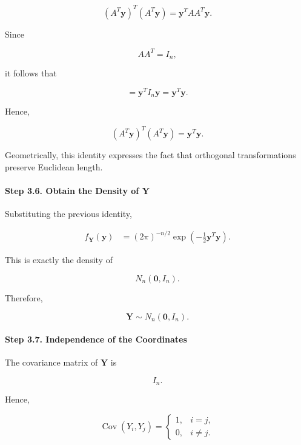\documentclass[11pt]{article}
\begin{document}
\begin{mdframed}[
		linewidth=0.8pt,
		roundcorner=6pt,
		backgroundcolor=gray!5,
		linecolor=gray!60,
		innertopmargin=10pt,
		innerbottommargin=10pt,
		innerleftmargin=10pt,
		innerrightmargin=10pt
		]
		\[
		(A^T\mathbf y)^T(A^T\mathbf y)
		=
		\mathbf y^TAA^T\mathbf y.
		\]
		
		Since
		
		\[
		AA^T=I_n,
		\]
		
		it follows that
		
		\[
		=
		\mathbf y^TI_n\mathbf y
		=
		\mathbf y^T\mathbf y.
		\]
		
		Hence,
		
		\[
		\boxed{
			(A^T\mathbf y)^T(A^T\mathbf y)
			=
			\mathbf y^T\mathbf y.
		}
		\]
		
		Geometrically, this identity expresses the fact that orthogonal
		transformations preserve Euclidean length.
		
		\vspace{0.3cm}
		
		\paragraph{Step 3.6. Obtain the Density of $\mathbf Y$}
		
		Substituting the previous identity,
		
		\[
		\begin{aligned}
			f_{\mathbf Y}(\mathbf y)
			&=
			(2\pi)^{-n/2}
			\exp
			\left(
			-\frac12
			\mathbf y^T\mathbf y
			\right).
		\end{aligned}
		\]
		
		This is exactly the density of
		
		\[
		N_n(\mathbf0,I_n).
		\]
		
		Therefore,
		
		\[
		\boxed{
			\mathbf Y
			\sim
			N_n(\mathbf0,I_n).
		}
		\]
		
		\vspace{0.3cm}
		
		\paragraph{Step 3.7. Independence of the Coordinates}
		
		The covariance matrix of $\mathbf Y$ is
		
		\[
		I_n.
		\]
		
		Hence,
		
		\[
		\operatorname{Cov}(Y_i,Y_j)
		=
		\begin{cases}
			1,&i=j,\\
			0,&i\neq j.
		\end{cases}
		\]
		

\end{mdframed}
\end{document}
